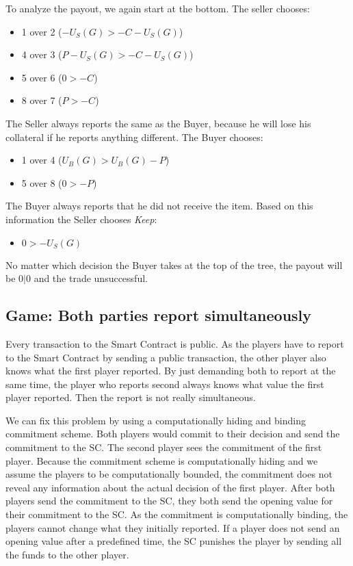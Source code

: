 \documentclass{cacthesis}
\begin{document}
To analyze the payout, we again start at the bottom. The seller chooses:
\begin{itemize}
    \item 1 over 2 ($-U_S(G)>-C - U_S(G)$)
    \item 4 over 3 ($P-U_S(G)> -C-U_S(G)$)
    \item 5 over 6 ($0 > -C$)
    \item 8 over 7 ($P > -C$)
\end{itemize}
The Seller always reports the same as the Buyer, because he will lose his collateral if he reports anything different.\newline
The Buyer chooses:
\begin{itemize}
    \item 1 over 4 ($U_B(G)>U_B(G) - P$)
    \item 5 over 8 ($0>-P$)
\end{itemize}
The Buyer always reports that he did not receive the item. Based on this information the Seller chooses \emph{Keep}:
\begin{itemize}
    \item $0 > -U_S(G)$
\end{itemize}
No matter which decision the Buyer takes at the top of the tree, the payout will be $0|0$ and the trade unsuccessful.


\subsection{Game: Both parties report simultaneously}
 Every transaction to the Smart Contract is public. As the players have to
 report to the Smart Contract by sending a public transaction, the other player
 also knows what the first player reported. By just demanding both to report at
 the same time, the player who reports second always knows what value the first player reported. Then the report is not really simultaneous.\newline

 We can fix this problem by using a computationally hiding and binding commitment scheme. Both players would commit to their decision and send the commitment to the SC. The second player sees the commitment of the first player. Because the commitment scheme is computationally hiding and we assume the players to be computationally bounded, the commitment does not reveal any information about the actual decision of the first player.
 After both players send the commitment to the SC, they both send the opening
 value for their commitment to the SC. As the commitment is computationally
 binding, the players cannot change what they initially reported. If a player
 does not send an opening value after a predefined time, the SC punishes the
 player by sending all the funds to the other player.
\end{document}
